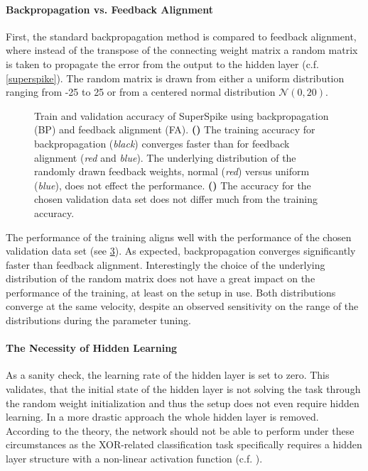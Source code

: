 \paragraph{Backpropagation vs. Feedback Alignment}
First, the standard backpropagation method is compared to feedback alignment, where instead of the transpose of the connecting weight matrix a random matrix is taken to propagate the error from the output to the hidden layer (c.f. \cref{superspike}). The random matrix is drawn from either a uniform distribution ranging from -25 to 25 or from a centered normal distribution $\mathcal{N}(0, 20)$.

\begin{figure}
	\begin{subfigure}[c]{0.5\textwidth}
		\centering
		\caption{}
		
		\label{bptrain73}
	\end{subfigure}	
	\begin{subfigure}[c]{0.5\textwidth}
		\centering
		\caption{}
		
		\label{bptest73}
	\end{subfigure}
	\caption[Train and validation accuracy of SuperSpike using backpropagation and feedback alignment.]{Train and validation accuracy of SuperSpike using backpropagation (BP) and feedback alignment (FA). \textbf{()} The training accuracy for backpropagation (\textit{black}) converges faster than for feedback alignment (\textit{red} and \textit{blue}). The underlying distribution of the randomly drawn feedback weights, normal (\textit{red}) versus uniform (\textit{blue}), does not effect the performance. \textbf{()} The accuracy for the chosen validation data set does not differ much from the training accuracy.}
	\label{BPvsFA73}
\end{figure}

The performance of the training aligns well with the performance of the chosen validation data set (see \cref{BPvsFA73}). As expected, backpropagation converges significantly faster than feedback alignment. Interestingly the choice of the underlying distribution of the random matrix does not have a great impact on the performance of the training, at least on the setup in use. Both distributions converge at the same velocity, despite an observed sensitivity on the range of the distributions during the parameter tuning.

\paragraph{The Necessity of Hidden Learning}
As a sanity check, the learning rate of the hidden layer is set to zero. This validates, that the initial state of the hidden layer is not solving the task through the random weight initialization and thus the setup does not even require hidden learning. In a more drastic approach the whole hidden layer is removed. According to the theory, the network should not be able to perform under these circumstances as the XOR-related classification task specifically requires a hidden layer structure with a non-linear activation function (c.f. \citealp{Goodfellow-et-al-2016}).

